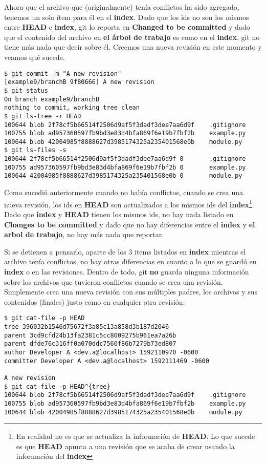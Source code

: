 Ahora que el archivo que (originalmente) tenía conflictos ha sido agregado, tenemos un solo ítem para él
en el {\bf index}. Dado que los ids no son los mismos entre {\bf HEAD} e {\bf index}, git lo reporta en {\bf Changed to be committed}
y dado que el contenido del archivo en {\bf el árbol de trabajo} es como en el {\bf index}, git no tiene más nada que decir sobre él.
Creemos una nueva revisión en este momento y veamos qué sucede.

\begin{lstlisting}[style=console_style,
	basicstyle=\small,
	caption={\bf git commit}]
$ git commit -m "A new revision"
[example9/branchB 9f80666] A new revision
$ git status
On branch example9/branchB
nothing to commit, working tree clean
$ git ls-tree -r HEAD
100644 blob 2f78cf5b66514f2506d9af5f3dadf3dee7aa6d9f    .gitignore
100755 blob ad957360597fb9bd3e83d4bfa869f6e19b7fbf2b    example.py
100644 blob 42004985f8888627d3985174325a235401568e0b    module.py
$ git ls-files -s
100644 2f78cf5b66514f2506d9af5f3dadf3dee7aa6d9f 0       .gitignore
100755 ad957360597fb9bd3e83d4bfa869f6e19b7fbf2b 0       example.py
100644 42004985f8888627d3985174325a235401568e0b 0       module.py
\end{lstlisting}

Como sucedió anteriormente cuando no había conflictos, cuando se crea una nueva revisión, los ids en {\bf HEAD}
son actualizados a los mismos ids del {\bf index}\footnote{En realidad no es que se actualiza la información de {\bf HEAD}.
Lo que sucede es que {\bf HEAD} apunta a una revisión que se acaba de crear usando la información del {\bf index}}. Dado
que {\bf index} y {\bf HEAD} tienen los mismos ids, no hay nada listado en {\bf Changes to be committed} y dado que no hay
diferencias entre el {\bf index} y {\bf el arbol de trabajo}, no hay más nada que reportar.

Si se detienen a pensarlo, aparte de los 3 items listados en {\bf index} mientras el archivo tenía conflictos, no hay
otras diferencias en cuanto a lo que se guardó en {\bf index} o en las revisiones. Dentro de todo, git {\bf no} guarda
ninguna información sobre los archivos que tuvieron conflictos cuando se crea una revisión. Simplemente crea una nueva revisión
con sus múltiples padres, los archivos y sus contenidos (finales) justo como en cualquier otra revisión:

\begin{lstlisting}[style=console_style,
	basicstyle=\small,
	caption=Verificando la información de la revisión]
$ git cat-file -p HEAD
tree 396032b1546d75672f3a85c13a858d3b187d2046
parent 3cd9cfd24b13fa2381c5cc8009275b961ea7a26b
parent dfde76c316ff0a070ddc7560f86b7279b73ed807
author Developer A <dev.a@localhost> 1592110970 -0600
committer Developer A <dev.a@localhost> 1592111469 -0600

A new revision
$ git cat-file -p HEAD^{tree}
100644 blob 2f78cf5b66514f2506d9af5f3dadf3dee7aa6d9f    .gitignore
100755 blob ad957360597fb9bd3e83d4bfa869f6e19b7fbf2b    example.py
100644 blob 42004985f8888627d3985174325a235401568e0b    module.py
\end{lstlisting}

